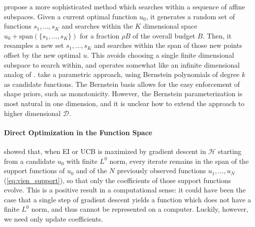 \documentclass{article}
\newcommand{\D}{\mathcal{D}} %
\newcommand{\F}{\mathcal{F}}
\newcommand{\Ft}{\tilde{\F}}
\newcommand{\Hs}{\mathcal{H}}
\newcommand{\vu}{u}
\begin{document}
\cite{shilton2020sequential} propose a more sophisticated method which searches within a sequence of affine subspaces.
Given a current optimal function $\vu_0$, it generates a random set of functions $s_1, \ldots, s_K$ and searches within the $K$ dimensional space $\vu_0 + \textrm{span}(\{s_1, \ldots, s_K\})$ for a fraction $\rho B$ of the overall budget $B$.
Then, it resamples a new set $s_1, \ldots, s_K$ and searches within the span of those new points offset by the new optimal $\vu$.
This avoids choosing a single finite dimensional subspace to search within, and operates somewhat like an infinite dimensional analog of \cite{kirschner2019adaptive}.
\cite{vellanki2019bayesian} take a parametric approach, using Bernstein polynomials of degree $k$ as candidate functions.
The Bernstein basis allows for the easy enforcement of shape priors, such as monotonicity.
However, the Bernstein parameterization is most natural in one dimension, and it is unclear how to extend the approach to higher dimensional $\D$.

\paragraph{Direct Optimization in the Function Space}

\cite{vien2018bayesian} showed that, when EI or UCB is maximized by gradient descent in $\Hs$ starting from a candidate $\vu_0$ with finite $L^0$ norm, every iterate remains in the span of the support functions of $\vu_0$ and of the $N$ previously observed functions $\vu_1,\ldots,\vu_N$ (\cref{eq:vien_support}), so that only the coefficients of those support functions evolve.
This is a positive result in a computational sense: it could have been the case that a single step of gradient descent yields a function which does not have a finite $L^0$ norm, and thus cannot be represented on a computer.
Luckily, however, we need only update coefficients.
\end{document}
